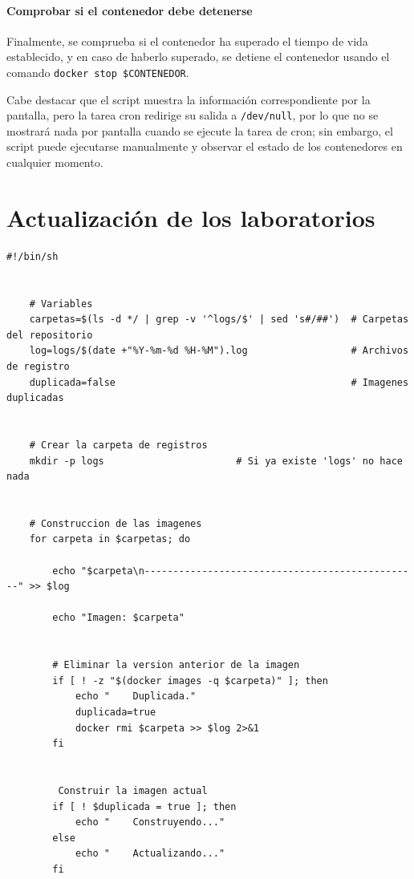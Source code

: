 \begin{appendices}
            \paragraph{Comprobar si el contenedor debe detenerse}

                Finalmente, se comprueba si el contenedor ha superado el tiempo de vida establecido, y en caso de haberlo superado, se detiene el contenedor usando el comando \texttt{docker stop \$CONTENEDOR}.

            Cabe destacar que el script muestra la información correspondiente por la pantalla, pero la tarea cron redirige su salida a \texttt{/dev/null}, por lo que no se mostrará nada por pantalla cuando se ejecute la tarea de cron; sin embargo, el script puede ejecutarse manualmente y observar el estado de los contenedores en cualquier momento.

            \newpage


        \section{Actualización de los laboratorios}
            
                \begin{lstlisting}[style=bash_style, basicstyle=\ttfamily\scriptsize]
    #!/bin/sh


    # Variables
    carpetas=$(ls -d */ | grep -v '^logs/$' | sed 's#/##')  # Carpetas del repositorio
    log=logs/$(date +"%Y-%m-%d %H-%M").log                  # Archivos de registro
    duplicada=false                                         # Imagenes duplicadas
    
    
    # Crear la carpeta de registros
    mkdir -p logs                       # Si ya existe 'logs' no hace nada
    
    
    # Construccion de las imagenes
    for carpeta in $carpetas; do
    
        echo "$carpeta\n------------------------------------------------" >> $log
    
        echo "Imagen: $carpeta"
    
    
        # Eliminar la version anterior de la imagen
        if [ ! -z "$(docker images -q $carpeta)" ]; then
            echo "    Duplicada."
            duplicada=true
            docker rmi $carpeta >> $log 2>&1
        fi
    
    
         Construir la imagen actual
        if [ ! $duplicada = true ]; then
            echo "    Construyendo..."
        else
            echo "    Actualizando..."
        fi
    

\end{lstlisting}
\end{appendices}

